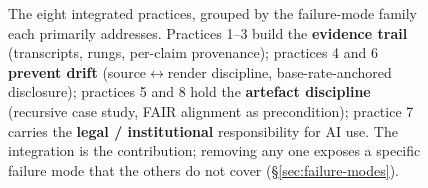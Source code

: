 \begin{figure}[!ht]
\caption{The eight integrated practices, grouped by the failure-mode
family each primarily addresses. Practices 1--3 build the
\textbf{evidence trail} (transcripts, rungs, per-claim provenance);
practices 4 and 6 \textbf{prevent drift} (source$\leftrightarrow$render
discipline, base-rate-anchored disclosure); practices 5 and 8 hold
the \textbf{artefact discipline} (recursive case study, FAIR
alignment as precondition); practice 7 carries the
\textbf{legal / institutional} responsibility for AI use. The
integration is the contribution; removing any one exposes a
specific failure mode that the others do not cover
(\S\ref{sec:failure-modes}).}
\label{fig:eight-practices}
\end{figure}

